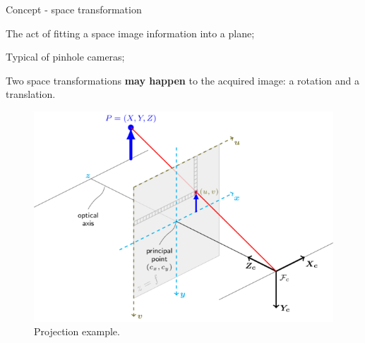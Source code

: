\documentclass[10pt]{beamer}
\begin{document}

\begin{frame}[fragile]{Concept - space transformation}

  The act of fitting a space image information into a plane;

  Typical of pinhole cameras;

  Two space transformations \textbf{may happen} to the acquired image: a rotation and a translation.

  \begin{figure}
    \centering
    \includegraphics[scale=0.3]{space_transf}
    \caption{Projection example.}
  \end{figure}

\end{frame}

\end{document}
